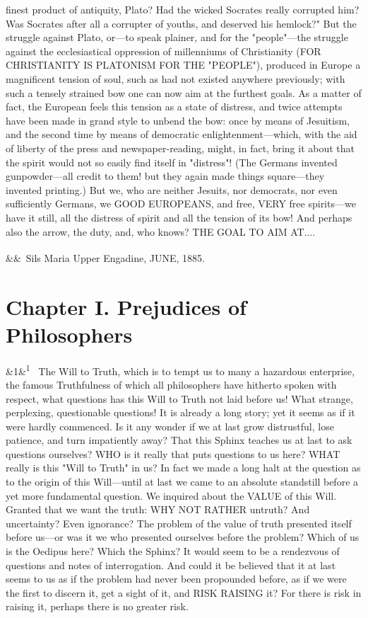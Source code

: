 \documentclass[12pt]{article}
\newcommand{\para}[1][]{\par\noindent\ifx&#1&\else\textsuperscript{\footnotesize #1}~\fi}
\begin{document}
finest product of antiquity, Plato? Had the wicked Socrates really corrupted him? Was Socrates after all a corrupter of youths, and deserved his hemlock?" But the struggle against Plato, or---to speak plainer, and for the "people"---the struggle against the ecclesiastical oppression of millenniums of Christianity (FOR CHRISTIANITY IS PLATONISM FOR THE "PEOPLE"), produced in Europe a magnificent tension of soul, such as had not existed anywhere previously; with such a tensely strained bow one can now aim at the furthest goals. As a matter of fact, the European feels this tension as a state of distress, and twice attempts have been made in grand style to unbend the bow: once by means of Jesuitism, and the second time by means of democratic enlightenment---which, with the aid of liberty of the press and newspaper-reading, might, in fact, bring it about that the spirit would not so easily find itself in "distress"! (The Germans invented gunpowder---all credit to them! but they again made things square---they invented printing.) But we, who are neither Jesuits, nor democrats, nor even sufficiently Germans, we GOOD EUROPEANS, and free, VERY free spirits---we have it still, all the distress of spirit and all the tension of its bow! And perhaps also the arrow, the duty, and, who knows? THE GOAL TO AIM AT....

\para Sils Maria Upper Engadine, JUNE, 1885.

\section*{Chapter I. Prejudices of Philosophers}

\para[1] The Will to Truth, which is to tempt us to many a hazardous enterprise, the famous Truthfulness of which all philosophers have hitherto spoken with respect, what questions has this Will to Truth not laid before us! What strange, perplexing, questionable questions! It is already a long story; yet it seems as if it were hardly commenced. Is it any wonder if we at last grow distrustful, lose patience, and turn impatiently away? That this Sphinx teaches us at last to ask questions ourselves? WHO is it really that puts questions to us here? WHAT really is this "Will to Truth" in us? In fact we made a long halt at the question as to the origin of this Will---until at last we came to an absolute standstill before a yet more fundamental question. We inquired about the VALUE of this Will. Granted that we want the truth: WHY NOT RATHER untruth? And uncertainty? Even ignorance? The problem of the value of truth presented itself before us---or was it we who presented ourselves before the problem? Which of us is the Oedipus here? Which the Sphinx? It would seem to be a rendezvous of questions and notes of interrogation. And could it be believed that it at last seems to us as if the problem had never been propounded before, as if we were the first to discern it, get a sight of it, and RISK RAISING it? For there is risk in raising it, perhaps there is no greater risk.
\end{document}
